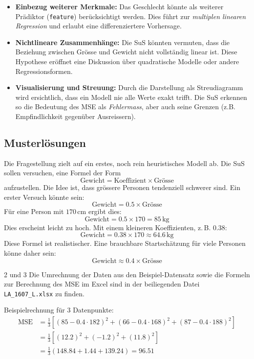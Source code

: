 \begin{itemize}
  \item \textbf{Einbezug weiterer Merkmale:} Das Geschlecht könnte als weiterer Prädiktor (\texttt{feature}) berücksichtigt werden. Dies führt zur \emph{multiplen linearen Regression} und erlaubt eine differenziertere Vorhersage.
  
  \item \textbf{Nichtlineare Zusammenhänge:} Die SuS könnten vermuten, dass die Beziehung zwischen Grösse und Gewicht nicht vollständig linear ist. Diese Hypothese eröffnet eine Diskussion über quadratische Modelle oder andere Regressionsformen.
  
  \item \textbf{Visualisierung und Streuung:} Durch die Darstellung als Streudiagramm wird ersichtlich, dass ein Modell nie alle Werte exakt trifft. Die SuS erkennen so die Bedeutung des MSE als \emph{Fehlermass}, aber auch seine Grenzen (z.B. Empfindlichkeit gegenüber Ausreissern).
\end{itemize}

\subsection*{Musterlösungen}

\begin{aufgabe}{1}
Die Fragestellung zielt auf ein erstes, noch rein heuristisches Modell ab. Die SuS sollen versuchen, eine Formel der Form
\[
\text{Gewicht} = \text{Koeffizient} \times \text{Grösse}
\]
aufzustellen. Die Idee ist, dass grössere Personen tendenziell schwerer sind. Ein erster Versuch könnte sein:
\[
\text{Gewicht} = 0.5 \times \text{Grösse}
\]
Für eine Person mit $170\,\text{cm}$ ergibt dies:
\[
\text{Gewicht} = 0.5 \times 170 = 85\,\text{kg}
\]
Dies erscheint leicht zu hoch. Mit einem kleineren Koeffizienten, z.\,B. $0.38$:
\[
\text{Gewicht} = 0.38 \times 170 \approx 64.6\,\text{kg}
\]
Diese Formel ist realistischer. Eine brauchbare Startschätzung für viele Personen könne daher sein:
\[
\boxed{\text{Gewicht} \approx 0.4 \times \text{Grösse}}
\]
\end{aufgabe}


\begin{aufgabe}{2 und 3}
Die Umrechnung der Daten aus den Beispiel-Datensatz sowie die Formeln zur Berechnung des MSE im Excel sind in der beiliegenden Datei \texttt{LA\_1607\_L.xlsx} zu finden.

Beispielrechnung für 3 Datenpunkte:
\begin{align*}
\text{MSE} &= \frac{1}{3} \left[(85 - 0.4 \cdot 182)^2 + (66 - 0.4 \cdot 168)^2 + (87 - 0.4 \cdot 188)^2 \right] \\
&= \frac{1}{3} \left[(12.2)^2 + (-1.2)^2 + (11.8)^2\right] \\
&= \frac{1}{3} (148.84 + 1.44 + 139.24) = \boxed{96.51}
\end{align*}
\end{aufgabe}
